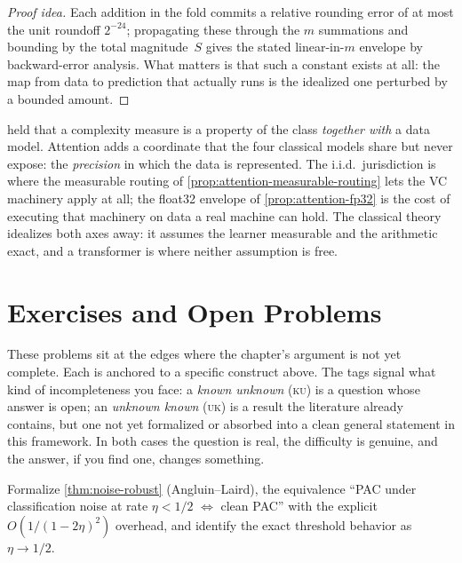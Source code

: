 \begin{proof}[Proof idea]
Each addition in the fold commits a relative rounding error of at most the unit roundoff $2^{-24}$; propagating these through the $m$ summations and bounding by the total magnitude~$S$ gives the stated linear-in-$m$ envelope by backward-error analysis.  What matters is that such a constant exists at all: the map from data to prediction that actually runs is the idealized one perturbed by a bounded amount.
\end{proof}

\begin{remark}
\label{rmk:attention-data-model}
 held that a complexity measure is a property of the class \emph{together with} a data model.  Attention adds a coordinate that the four classical models share but never expose: the \emph{precision} in which the data is represented.  The i.i.d.\ jurisdiction is where the measurable routing of \cref{prop:attention-measurable-routing} lets the VC machinery apply at all; the float32 envelope of \cref{prop:attention-fp32} is the cost of executing that machinery on data a real machine can hold.  The classical theory idealizes both axes away: it assumes the learner measurable and the arithmetic exact, and a transformer is where neither assumption is free.
\end{remark}

\section{Exercises and Open Problems}
\label{sec:ch2-open}

These problems sit at the edges where the chapter's argument is not yet complete. Each is anchored to a specific construct above. The tags signal what kind of incompleteness you face: a \emph{known unknown} (\textsc{ku}) is a question whose answer is open; an \emph{unknown known} (\textsc{uk}) is a result the literature already contains, but one not yet formalized or absorbed into a clean general statement in this framework. In both cases the question is real, the difficulty is genuine, and the answer, if you find one, changes something.

\begin{openprob}
\label{op:noise}
Formalize \cref{thm:noise-robust} (Angluin--Laird), the equivalence ``PAC under classification noise at rate $\eta < 1/2$ $\Leftrightarrow$ clean PAC'' with the explicit $O(1/(1-2\eta)^2)$ overhead, and identify the exact threshold behavior as $\eta \to 1/2$.
\end{openprob}

